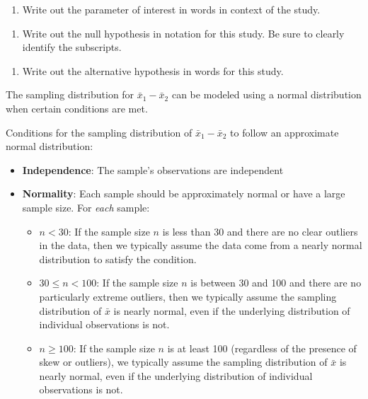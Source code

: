 \documentclass[
]{report}
\providecommand{\tightlist}{%
  \setlength{\itemsep}{0pt}\setlength{\parskip}{0pt}}
\begin{document}
\begin{enumerate}
\def\labelenumi{\arabic{enumi}.}
\tightlist
\item
  Write out the parameter of interest in words in context of the study.
\end{enumerate}

\vspace{1in}

\begin{enumerate}
\def\labelenumi{\arabic{enumi}.}
\setcounter{enumi}{1}
\tightlist
\item
  Write out the null hypothesis in notation for this study. Be sure to clearly identify the subscripts.
\end{enumerate}

\vspace{0.4in}

\begin{enumerate}
\def\labelenumi{\arabic{enumi}.}
\setcounter{enumi}{2}
\tightlist
\item
  Write out the alternative hypothesis in words for this study.
\end{enumerate}

\vspace{0.8in}

The sampling distribution for \(\bar{x}_1-\bar{x}_2\) can be modeled using a normal distribution when certain conditions are met.

Conditions for the sampling distribution of \(\bar{x}_1-\bar{x}_2\) to follow an approximate normal distribution:

\begin{itemize}
\item
  \textbf{Independence}: The sample's observations are independent
\item
  \textbf{Normality}: Each sample should be approximately normal or have a large sample size. For \emph{each} sample:

  \begin{itemize}
  \item
    \(n < 30\): If the sample size \(n\) is less than 30 and there are no clear outliers in the data, then we typically assume the data come from a nearly normal distribution to satisfy the condition.
  \item
    \(30 \le n < 100\): If the sample size \(n\) is between 30 and 100 and there are no particularly extreme outliers, then we typically assume the sampling distribution of \(\bar{x}\) is nearly normal, even if the underlying distribution of individual observations is not.
  \item
    \(n \geq 100\): If the sample size \(n\) is at least 100 (regardless of the presence of skew or outliers), we typically assume the sampling distribution of \(\bar{x}\) is nearly normal, even if the underlying distribution of individual observations is not.
  \end{itemize}
\end{itemize}
\end{document}
